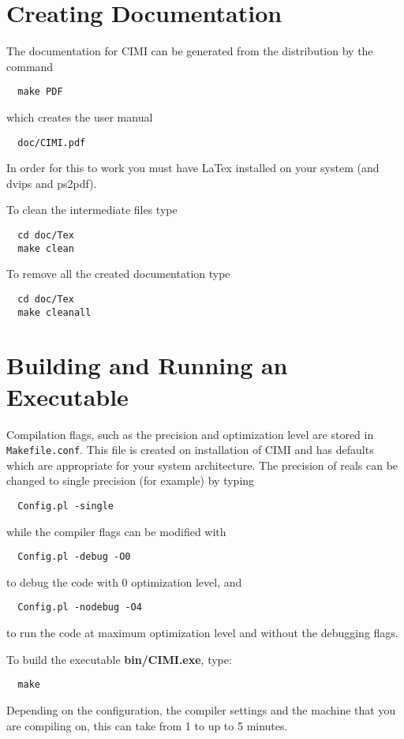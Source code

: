 \section{Creating Documentation}

The documentation for CIMI can be generated from the distribution by
the command
\begin{verbatim}
  make PDF
\end{verbatim}
which creates the user manual
\begin{verbatim}
  doc/CIMI.pdf
\end{verbatim}
In order for this to work you must have
LaTex installed on your system (and dvips and ps2pdf).  

To clean the intermediate files type
\begin{verbatim}
  cd doc/Tex
  make clean
\end{verbatim}
To remove all the created documentation type
\begin{verbatim}
  cd doc/Tex
  make cleanall
\end{verbatim}

\section{Building and Running an Executable}


Compilation flags, such as the precision and optimization 
level are stored in {\tt Makefile.conf}. This file is created on
installation of CIMI and has defaults which are appropriate for
your system architecture.  The precision of reals
can be changed to single precision (for example) by typing
\begin{verbatim}
  Config.pl -single
\end{verbatim}
while the compiler flags can be modified with
\begin{verbatim}
  Config.pl -debug -O0
\end{verbatim}
to debug the code with 0 optimization level, and
\begin{verbatim}
  Config.pl -nodebug -O4
\end{verbatim}
to run the code at maximum optimization level and without the debugging flags.

To build the executable {\bf bin/CIMI.exe}, type:
\begin{verbatim}
  make
\end{verbatim} 
Depending on the configuration, the compiler settings and the machine 
that you are compiling on, this can take from 1 to up to 5 minutes.  

